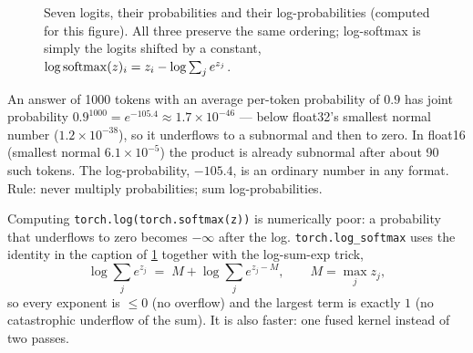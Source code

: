 \begin{figure}[t]
\centering
{}
\caption{Seven logits, their probabilities and their log-probabilities (computed for this figure).
All three preserve the same ordering; log-softmax is simply the logits shifted by a constant,
$\log\operatorname{softmax}(z)_i = z_i - \log\sum_j e^{z_j}$.}
\label{fig:refine:three-views}
\end{figure}

\begin{napkinmath}
An answer of 1000 tokens with an average per-token probability of $0.9$ has joint probability
$0.9^{1000} = e^{-105.4} \approx 1.7\times10^{-46}$ --- below float32's smallest normal number
($1.2\times10^{-38}$), so it underflows to a subnormal and then to zero. In float16 (smallest normal
$6.1\times10^{-5}$) the product is already subnormal after about 90 such tokens. The log-probability,
$-105.4$, is an ordinary number in any format. Rule: never multiply probabilities; sum
log-probabilities.
\end{napkinmath}

Computing \texttt{torch.log(torch.softmax(z))} is numerically poor: a probability that underflows to
zero becomes $-\infty$ after the log. \texttt{torch.log\_softmax} uses the identity in the caption of
\cref{fig:refine:three-views} together with the log-sum-exp trick,
\begin{equation}
  \log \sum_j e^{z_j} \;=\; M + \log \sum_j e^{z_j - M}, \qquad M = \max_j z_j,
  \label{eq:refine:lse}
\end{equation}
so every exponent is $\le 0$ (no overflow) and the largest term is exactly $1$ (no catastrophic
underflow of the sum). It is also faster: one fused kernel instead of two passes.

